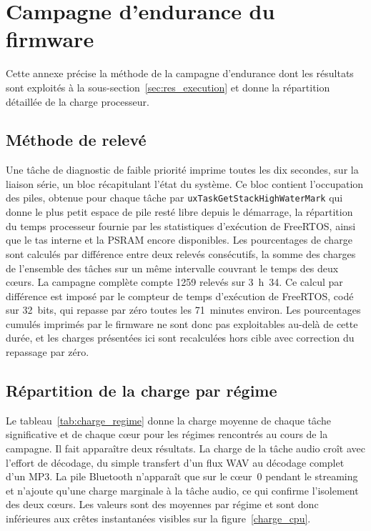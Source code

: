 \chapter{Campagne d'endurance du firmware}
\label{ann:endurance}

Cette annexe précise la méthode de la campagne d'endurance dont les résultats sont exploités à la sous-section~\ref{sec:res_execution} et donne la répartition détaillée de la charge processeur.

\section*{Méthode de relevé}

Une tâche de diagnostic de faible priorité imprime toutes les dix secondes, sur la liaison série, un bloc récapitulant l'état du système. Ce bloc contient l'occupation des piles, obtenue pour chaque tâche par \texttt{uxTaskGetStackHighWaterMark} qui donne le plus petit espace de pile resté libre depuis le démarrage, la répartition du temps processeur fournie par les statistiques d'exécution de FreeRTOS, ainsi que le tas interne et la PSRAM encore disponibles. Les pourcentages de charge sont calculés par différence entre deux relevés consécutifs, la somme des charges de l'ensemble des tâches sur un même intervalle couvrant le temps des deux cœurs. La campagne complète compte 1259 relevés sur 3~h~34. Ce calcul par différence est imposé par le compteur de temps d'exécution de FreeRTOS, codé sur 32~bits, qui repasse par zéro toutes les 71~minutes environ. Les pourcentages cumulés imprimés par le firmware ne sont donc pas exploitables au-delà de cette durée, et les charges présentées ici sont recalculées hors cible avec correction du repassage par zéro.

\section*{Répartition de la charge par régime}

Le tableau~\ref{tab:charge_regime} donne la charge moyenne de chaque tâche significative et de chaque cœur pour les régimes rencontrés au cours de la campagne. Il fait apparaître deux résultats. La charge de la tâche audio croît avec l'effort de décodage, du simple transfert d'un flux WAV au décodage complet d'un MP3. La pile Bluetooth n'apparaît que sur le cœur~0 pendant le streaming et n'ajoute qu'une charge marginale à la tâche audio, ce qui confirme l'isolement des deux cœurs. Les valeurs sont des moyennes par régime et sont donc inférieures aux crêtes instantanées visibles sur la figure~\ref{charge_cpu}.


